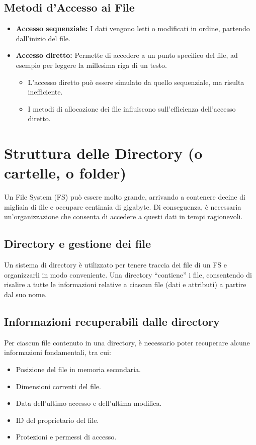 \subsection{Metodi d’Accesso ai File}

\begin{itemize}
    \item \textbf{Accesso sequenziale:} I dati vengono letti o modificati in ordine, partendo dall’inizio del file.
    \item \textbf{Accesso diretto:} Permette di accedere a un punto specifico del file, ad esempio per leggere la millesima riga di un testo.
    \begin{itemize}
        \item L'accesso diretto può essere simulato da quello sequenziale, ma risulta inefficiente.
        \item I metodi di allocazione dei file influiscono sull'efficienza dell'accesso diretto.
    \end{itemize}
\end{itemize}

\section{Struttura delle Directory (o cartelle, o folder)}
\label{sec:directory_structure}

Un File System (FS) può essere molto grande, arrivando a contenere decine di migliaia di file e occupare centinaia di gigabyte. Di conseguenza, è necessaria un'organizzazione che consenta di accedere a questi dati in tempi ragionevoli.


\subsection{Directory e gestione dei file}
Un sistema di directory è utilizzato per tenere traccia dei file di un FS e organizzarli in modo conveniente. Una directory “contiene” i file, consentendo di risalire a tutte le informazioni relative a ciascun file (dati e attributi) a partire dal suo nome.

\subsection{Informazioni recuperabili dalle directory}
Per ciascun file contenuto in una directory, è necessario poter recuperare alcune informazioni fondamentali, tra cui:
\begin{itemize}
    \item Posizione del file in memoria secondaria.
    \item Dimensioni correnti del file.
    \item Data dell’ultimo accesso e dell’ultima modifica.
    \item ID del proprietario del file.
    \item Protezioni e permessi di accesso.
\end{itemize}

